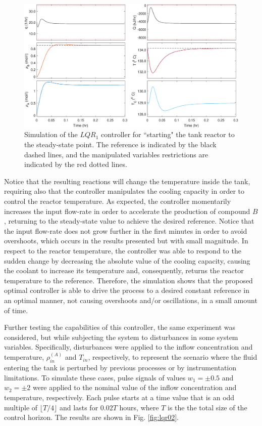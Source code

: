 \documentclass[a4paper,11pt]{book}
\numberwithin{figure}{chapter}
\numberwithin{equation}{chapter}
\numberwithin{table}{chapter}
\theoremstyle{definition}
\begin{document}
\begin{figure}[ht] \centering
	\includegraphics[width=\textwidth]{chapter7/lqr01}
	
	\caption{Simulation of the $LQR_1$ controller for ``starting" the tank reactor to the steady-state point. The reference is indicated by the black dashed lines, and the manipulated variables restrictions are indicated by the red dotted lines.}
	\label{fig:lqr01}
\end{figure}

Notice that the resulting reactions will change the temperature inside the tank, requiring also that the controller manipulates the cooling capacity in order to control the reactor temperature. As expected, the controller momentarily increases the input flow-rate in order to accelerate the production of compound $B$, returning to the steady-state value to achieve the desired reference. Notice that the input flow-rate does not grow further in the first minutes in order to avoid overshoots, which occurs in the results presented but with small magnitude. In respect to the reactor temperature, the controller was able to respond to the sudden change by decreasing the absolute value of the cooling capacity, causing the coolant to increase its temperature and, consequently, returns the reactor temperature to the reference. Therefore, the simulation shows that the proposed optimal controller is able to drive the process to a desired constant reference in an optimal manner, not causing overshoots and/or oscillations, in a small amount of time.

Further testing the capabilities of this controller, the same experiment was considered, but while subjecting the system to disturbances in some system variables. Specifically, disturbances were applied to the inflow concentration and temperature, $\rho^{(A)}_{in}$ and $T_{in}$, respectively, to represent the scenario where the fluid entering the tank is perturbed by previous processes or by instrumentation limitations. To simulate these cases, pulse signals of values $w_1 = \pm 0.5$ and $w_2 = \pm 2$ were applied to the nominal value of the inflow concentration and temperature, respectively. Each pulse starts at a time value that is an odd multiple of $\lfloor T/4 \rfloor$ and lasts for $0.02T$ hours, where $T$ is the the total size of the control horizon. The results are shown in Fig. \ref{fig:lqr02}.
\end{document}
